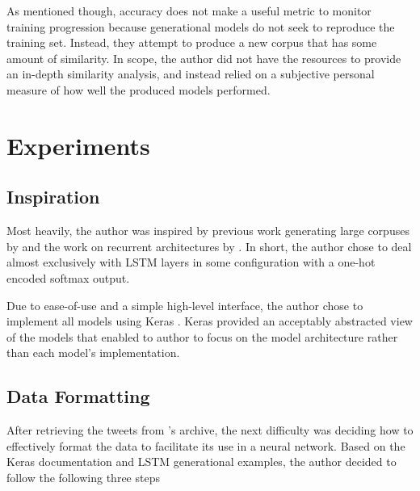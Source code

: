 \documentclass[letterpaper]{article}
\begin{document}
    As mentioned though, accuracy does not make a useful metric to monitor training progression because generational models do not seek to reproduce the training set. Instead, they attempt to produce a new corpus that has some amount of similarity. In scope, the author did not have the resources to provide an in-depth similarity analysis, and instead relied on a subjective personal measure of how well the produced models performed.

\section{Experiments}
    \subsection{Inspiration}
        Most heavily, the author was inspired by previous work generating large corpuses by \citet{thoutt_2017} and the work on recurrent architectures by \citet{karpathy_2015}. In short, the author chose to deal almost exclusively with LSTM layers in some configuration with a one-hot encoded softmax output.

        Due to ease-of-use and a simple high-level interface, the author chose to implement all models using Keras \citep{chollet2015keras}. Keras provided an acceptably abstracted view of the models that enabled to author to focus on the model architecture rather than each model's implementation.

    \subsection{Data Formatting}
        After retrieving the tweets from \citet{brown_2017}'s archive, the next difficulty was deciding how to effectively format the data to facilitate its use in a neural network. Based on the Keras documentation and LSTM generational examples, the author decided to follow the following three steps
\end{document}
